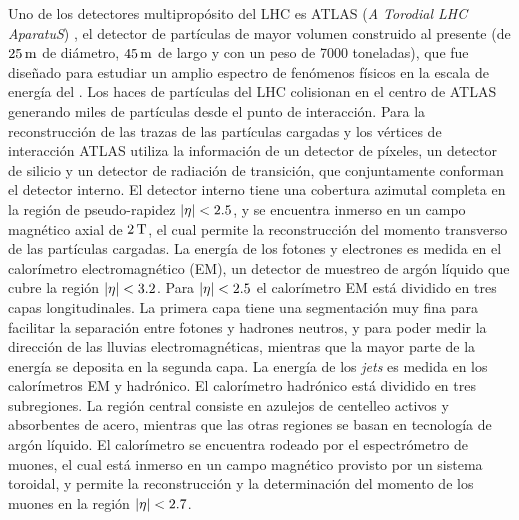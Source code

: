 Uno de los detectores multipropósito del LHC es ATLAS (\emph{A Torodial LHC AparatuS})
\cite{atlas}, el detector de partículas de mayor volumen construido
al presente (de $\unit[25]{m}$ de diámetro, $\unit[45]{m}$ de largo y con un
peso de 7000 toneladas), que fue dise\~nado para estudiar un amplio espectro de
fenómenos físicos en la escala de energía del {\tev}.
Los haces de partículas del LHC colisionan en el centro de ATLAS generando miles
de partículas desde el punto de interacción.
Para la reconstrucción de las trazas de las partículas cargadas y los vértices
de interacción ATLAS utiliza la información de un detector de píxeles, un
detector de silicio y un detector de radiación de transición, que conjuntamente
conforman el detector interno. El detector interno tiene una cobertura azimutal
completa en la región de pseudo-rapidez $\abseta < 2.5$, y se encuentra inmerso
en un campo magnético axial de $\unit[2]{T}$, el cual permite la reconstrucción
del momento transverso de las partículas cargadas.
La energía de los fotones y electrones es medida en el calorímetro
electromagnético (EM), un detector de muestreo de argón líquido que cubre
la región $\abseta < 3.2$. Para $\abseta < 2.5$ el calorímetro EM está dividido en tres
capas longitudinales. La primera capa tiene una segmentación muy fina para
facilitar la separación entre fotones y hadrones neutros, y para poder medir la
dirección de las lluvias electromagnéticas, mientras que la mayor parte de la
energía se deposita en la segunda capa. La energía de
los \emph{jets} es medida en los calorímetros EM y hadrónico. El calorímetro
hadrónico está dividido en tres subregiones. La región central consiste en azulejos
de centelleo activos y absorbentes de acero, mientras que las otras regiones
se basan en tecnología de argón líquido.
El calorímetro se encuentra rodeado por el espectrómetro de muones, el cual está
inmerso en un campo magnético provisto por un sistema toroidal, y permite la reconstrucción
y la determinación del momento de los muones en la región $\abseta < 2.7$.

